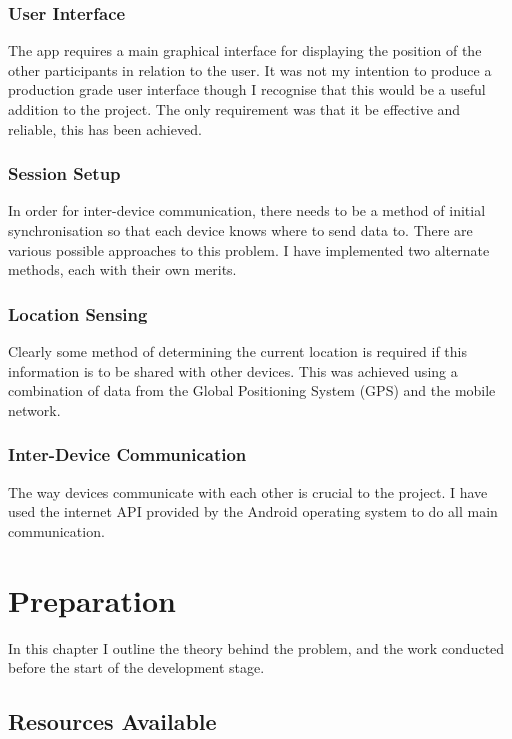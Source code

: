 \subsection{User Interface}

The app requires a main graphical interface for displaying the position of the other participants in relation to the user. It was not my intention to produce a production grade user interface though I recognise that this would be a useful addition to the project. The only requirement was that it be effective and reliable, this has been achieved.

\subsection{Session Setup}

In order for inter-device communication, there needs to be a method of initial synchronisation so that each device knows where to send data to. There are various possible approaches to this problem. I have implemented two alternate methods, each with their own merits.

\subsection{Location Sensing}
Clearly some method of determining the current location is required if this information is to be shared with other devices. This was achieved using a combination of data from the Global Positioning System (GPS) and the mobile network.

\subsection{Inter-Device Communication}

The way devices communicate with each other is crucial to the project. I have used the internet API provided by the Android operating system to do all main communication.

\cleardoublepage

\chapter{Preparation}

In this chapter I outline the theory behind the problem, and the work conducted before the start of the development stage.

\section{Resources Available}

